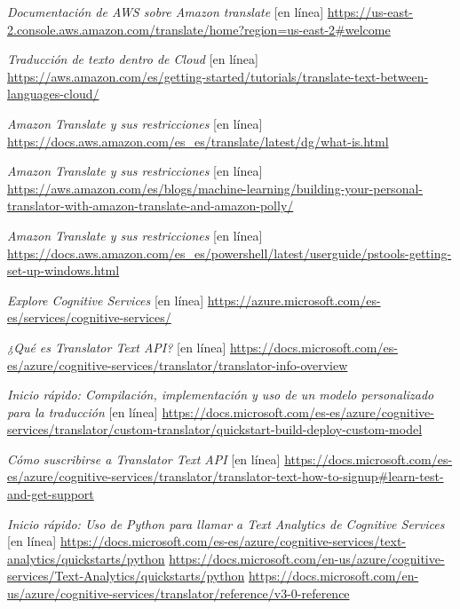 \documentclass[runningheads]{llncs}
\begin{document}
	\begin{thebibliography}{8}
		
		
		\textit{Documentación de AWS sobre Amazon translate} [en línea] \url{https://us-east-2.console.aws.amazon.com/translate/home?region=us-east-2#welcome}
		
		\textit{Traducción de texto dentro de Cloud} [en línea] \url{https://aws.amazon.com/es/getting-started/tutorials/translate-text-between-languages-cloud/}
		
		\textit{Amazon Translate y sus restricciones} [en línea] \url{https://docs.aws.amazon.com/es_es/translate/latest/dg/what-is.html}
		
		\textit{Amazon Translate y sus restricciones} [en línea] \url{https://aws.amazon.com/es/blogs/machine-learning/building-your-personal-translator-with-amazon-translate-and-amazon-polly/}
		
		\textit{Amazon Translate y sus restricciones} [en línea] \url{https://docs.aws.amazon.com/es_es/powershell/latest/userguide/pstools-getting-set-up-windows.html}
		
		\textit{Explore Cognitive Services} [en línea] \url{https://azure.microsoft.com/es-es/services/cognitive-services/}
		
		\textit{¿Qué es Translator Text API?} [en línea] \url{https://docs.microsoft.com/es-es/azure/cognitive-services/translator/translator-info-overview}
		
		\textit{Inicio rápido: Compilación, implementación y uso de un modelo personalizado para la traducción} [en línea] \url{https://docs.microsoft.com/es-es/azure/cognitive-services/translator/custom-translator/quickstart-build-deploy-custom-model}
		
		\textit{Cómo suscribirse a Translator Text API} [en línea] \url{https://docs.microsoft.com/es-es/azure/cognitive-services/translator/translator-text-how-to-signup#learn-test-and-get-support}
		
		\textit{Inicio rápido: Uso de Python para llamar a Text Analytics de Cognitive Services} [en línea] \url{https://docs.microsoft.com/es-es/azure/cognitive-services/text-analytics/quickstarts/python}
		\url{https://docs.microsoft.com/en-us/azure/cognitive-services/Text-Analytics/quickstarts/python}
		\url{https://docs.microsoft.com/en-us/azure/cognitive-services/translator/reference/v3-0-reference}
		
	\end{thebibliography}
	
\end{document}
